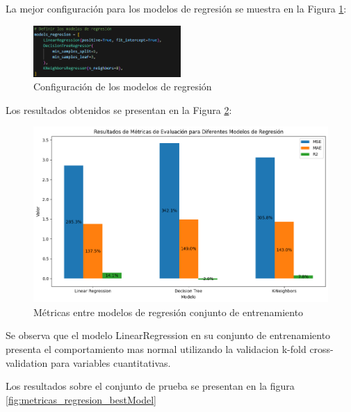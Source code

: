 La mejor configuración para los modelos de regresión se muestra en la Figura \ref{fig:config_regresion}:

\begin{figure}[H]
    \centering
    \includegraphics[width=0.5\textwidth]{img/compara_algoritmos/configModelsRegresion.png}
    \caption{Configuración de los modelos de regresión}
    \label{fig:config_regresion}
\end{figure}

Los resultados obtenidos se presentan en la Figura \ref{fig:metricas_regresion}:

\begin{figure}[H]
    \centering
    \includegraphics[width=1\textwidth]{img/compara_algoritmos/metricasEntreModelosRegresion.png}
    \caption{Métricas entre modelos de regresión conjunto de entrenamiento}
    \label{fig:metricas_regresion}
\end{figure}

Se observa que el modelo LinearRegression en su conjunto de entrenamiento presenta el comportamiento mas normal utilizando la validacion k-fold cross-validation para variables cuantitativas.

Los resultados sobre el conjunto de prueba se presentan en la figura \ref{fig:metricas_regresion_bestModel}


